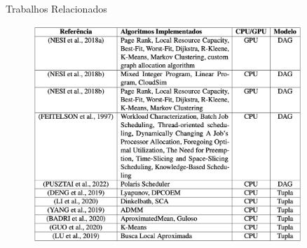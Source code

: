 \begin{frame}{Trabalhos Relacionados}
    \begin{figure}
        \centering
        \includegraphics[width=0.9\textwidth]{Figuras/trabalhos-relacionados.png}
    \end{figure}
\end{frame}